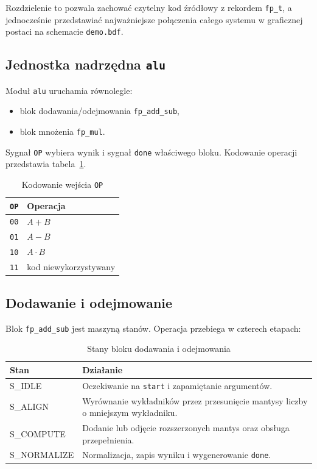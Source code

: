 \documentclass[12pt,a4paper]{article}
\begin{document}
Rozdzielenie to pozwala zachować czytelny kod źródłowy z rekordem
\texttt{fp\_t}, a jednocześnie przedstawiać najważniejsze połączenia całego
systemu w graficznej postaci na schemacie \texttt{demo.bdf}.

\subsection{Jednostka nadrzędna \texttt{alu}}

Moduł \texttt{alu} uruchamia równolegle:

\begin{itemize}
    \item blok dodawania/odejmowania \texttt{fp\_add\_sub},
    \item blok mnożenia \texttt{fp\_mul}.
\end{itemize}

Sygnał \texttt{OP} wybiera wynik i sygnał \texttt{done} właściwego bloku.
Kodowanie operacji przedstawia tabela~\ref{tab:op}.

\begin{table}[H]
    \centering
    \caption{Kodowanie wejścia \texttt{OP}}
    \label{tab:op}
    \begin{tabular}{cl}
        \toprule
        \texttt{OP} & Operacja \\
        \midrule
        \texttt{00} & \(A+B\) \\
        \texttt{01} & \(A-B\) \\
        \texttt{10} & \(A\cdot B\) \\
        \texttt{11} & kod niewykorzystywany \\
        \bottomrule
    \end{tabular}
\end{table}

\subsection{Dodawanie i odejmowanie}

Blok \texttt{fp\_add\_sub} jest maszyną stanów. Operacja przebiega
w czterech etapach:

\begin{table}[H]
    \centering
    \caption{Stany bloku dodawania i odejmowania}
    \begin{tabularx}{\textwidth}{>{\ttfamily}p{}X}
        \toprule
        \normalfont Stan & Działanie \\
        \midrule
        S\_IDLE & Oczekiwanie na \texttt{start} i zapamiętanie argumentów. \\
        S\_ALIGN & Wyrównanie wykładników przez przesunięcie mantysy liczby o mniejszym wykładniku. \\
        S\_COMPUTE & Dodanie lub odjęcie rozszerzonych mantys oraz obsługa przepełnienia. \\
        S\_NORMALIZE & Normalizacja, zapis wyniku i wygenerowanie \texttt{done}. \\
        \bottomrule
    \end{tabularx}
\end{table}
\end{document}

